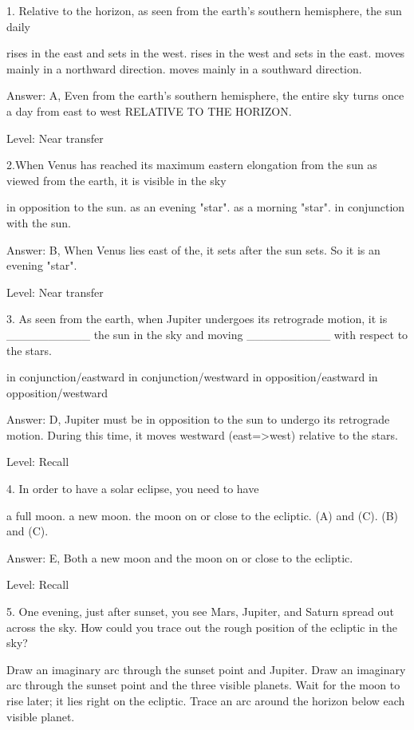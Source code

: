 

1. Relative to the horizon, as seen from the earth's southern hemisphere, the sun daily

    rises in the east and sets in the west.
    rises in the west and sets in the east.
    moves mainly in a northward direction.
    moves mainly in a southward direction. 

Answer: A, Even from the earth's southern hemisphere, the entire sky turns once a day from east to west RELATIVE TO THE HORIZON.

Level: Near transfer

2.When Venus has reached its maximum eastern elongation from the sun as viewed from the earth, it is visible in the sky

    in opposition to the sun.
    as an evening "star".
    as a morning "star".
    in conjunction with the sun. 

Answer: B, When Venus lies east of the, it sets after the sun sets. So it is an evening "star".

Level: Near transfer

3. As seen from the earth, when Jupiter undergoes its retrograde motion, it is __________ the sun in the sky and moving __________ with respect to the stars.

    in conjunction/eastward
    in conjunction/westward
    in opposition/eastward
    in opposition/westward 

Answer: D, Jupiter must be in opposition to the sun to undergo its retrograde motion. During this time, it moves westward (east=>west) relative to the stars.

Level: Recall

4. In order to have a solar eclipse, you need to have

    a full moon.
    a new moon.
    the moon on or close to the ecliptic.
    (A) and (C).
    (B) and (C). 

Answer: E, Both a new moon and the moon on or close to the ecliptic.

Level: Recall

5. One evening, just after sunset, you see Mars, Jupiter, and Saturn spread out across the sky. How could you trace out the rough position of the ecliptic in the sky?

    Draw an imaginary arc through the sunset point and Jupiter.
    Draw an imaginary arc through the sunset point and the three visible planets.
    Wait for the moon to rise later; it lies right on the ecliptic.
    Trace an arc around the horizon below each visible planet. 

